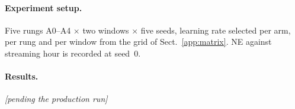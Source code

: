 \paragraph{Experiment setup.} Five rungs A0--A4 $\times$ two windows $\times$ five seeds, learning rate selected per arm, per rung and per window from the grid of Sect.~\ref{app:matrix}. NE against streaming hour is recorded at seed~0.

\paragraph{Results.} \emph{[pending the production run]}

